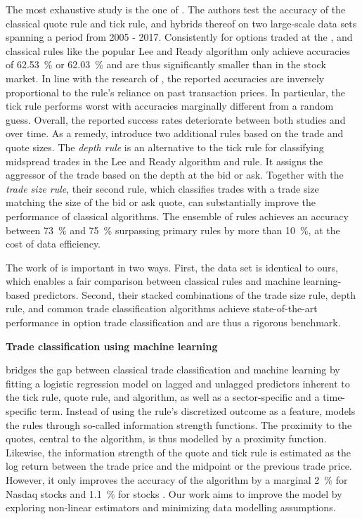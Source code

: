 The most exhaustive study is the one of \textcite[1--39]{grauerOptionTradeClassification2022}.  The authors test the accuracy of the classical quote rule and tick rule, and hybrids thereof on two large-scale data sets spanning a period from 2005 - 2017. Consistently for options traded at the , and  classical rules like the popular Lee and Ready algorithm only achieve accuracies of \SI{62.53}{\percent} or \SI{62.03}{\percent} and are thus significantly smaller than in the stock market. In line with the research of  \textcite[886]{savickasInferringDirectionOption2003}, the reported accuracies are inversely proportional to the rule's reliance on past transaction prices. In particular, the tick rule performs worst with accuracies marginally different from a random guess. Overall, the reported success rates deteriorate between both studies and over time. As a remedy, \textcite[14--17]{grauerOptionTradeClassification2022} introduce two additional rules based on the trade and quote sizes. The \textit{depth rule} is an alternative to the tick rule for classifying midspread trades in the Lee and Ready algorithm and  rule. It assigns the aggressor of the trade based on the depth at the bid or ask. Together with the \textit{trade size rule}, their second rule, which classifies trades with a trade size matching the size of the bid or ask quote, can substantially improve the performance of classical algorithms. The ensemble of rules achieves an accuracy between \SI{73}{\percent} and \SI{75}{\percent} surpassing primary rules by more than \SI{10}{\percent}, at the cost of data efficiency.

The work of \textcite{grauerOptionTradeClassification2022} is important in two ways. First, the data set is identical to ours, which enables a fair comparison between classical rules and machine learning-based predictors. Second, their stacked combinations of the trade size rule, depth rule, and common trade classification algorithms achieve state-of-the-art performance in option trade classification and are thus a rigorous benchmark.

\textbf{Trade classification using machine learning}

\textcite[5]{rosenthalModelingTradeDirection2012} bridges the gap between classical trade classification and machine learning by fitting a logistic regression model on lagged and unlagged predictors inherent to the tick rule, quote rule, and  algorithm, as well as a sector-specific and a time-specific term. Instead of using the rule's discretized outcome as a feature, \textcite[481-482]{rosenthalModelingTradeDirection2012} models the rules through so-called information strength functions. The proximity to the quotes, central to the  algorithm, is thus modelled by a proximity function. Likewise, the information strength of the quote and tick rule is estimated as the log return between the trade price and the midpoint or the previous trade price. However, it only improves the accuracy of the  algorithm by a marginal \SI{2}{\percent} for Nasdaq stocks and \SI{1.1}{\percent} for  stocks \textcite[15]{rosenthalModelingTradeDirection2012}. Our work aims to improve the model by exploring non-linear estimators and minimizing data modelling assumptions.

